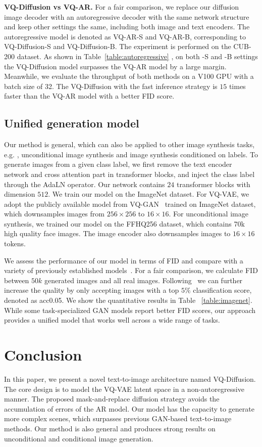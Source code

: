  \textbf{VQ-Diffusion vs VQ-AR.} For a fair comparison, we replace our diffusion image decoder with an autoregressive decoder with the same network structure and keep other settings the same, including both image and text encoders. The autoregressive model is denoted as VQ-AR-S and VQ-AR-B, corresponding to VQ-Diffusion-S and VQ-Diffusion-B. The experiment is performed on the CUB-200 dataset. As shown in Table~\ref{table:autoregressive} , on both -S and -B settings the VQ-Diffusion model surpasses the VQ-AR model by a large margin. Meanwhile, we evaluate the throughput of both methods on a V100 GPU with a batch size of 32. The VQ-Diffusion with the fast inference strategy is $15$ times faster than the VQ-AR model with a better FID score.

\subsection{Unified generation model} Our method is general, which can also be applied to other image synthesis tasks, e.g. , unconditional image synthesis and image synthesis conditioned on labels. To generate images from a given class label, we first remove the text encoder network and cross attention part in transformer blocks, and inject the class label through the AdaLN operator. Our network contains $24$ transformer blocks with dimension $512$. We train our model on the ImageNet dataset. For VQ-VAE, we adopt the publicly available model from VQ-GAN~\cite{esser2021taming} trained on ImageNet dataset, which downsamples images from $256 \times 256$ to $16 \times 16$. For unconditional image synthesis, we trained our model on the FFHQ256 dataset, which contains 70k high quality face images. The image encoder also downsamples images to $16 \times 16$ tokens. 

We assess the performance of our model in terms of FID and compare with a variety of previously established models~\cite{brock2018large,nichol2021improved,dhariwal2021diffusion,esser2021taming,esser2021imagebart}. For a fair comparison, we calculate FID between $50k$ generated images and all real images. Following~\cite{esser2021taming} we can further increase the quality by only accepting images with a top $5\%$ classification score, denoted as acc0.05. We show the quantitative results in Table ~\ref{table:imagenet}. While some task-specialized GAN models report better FID scores, our approach provides a unified model that works well across a wide range of tasks.

\section{Conclusion}

In this paper, we present a novel text-to-image architecture named VQ-Diffusion. The core design is to model the VQ-VAE latent space in a non-autoregressive manner. The proposed mask-and-replace diffusion strategy avoids the accumulation of errors of the AR model. Our model has the capacity to generate more complex scenes, which surpasses previous GAN-based text-to-image methods. Our method is also general and produces strong results on unconditional and conditional image generation. 


